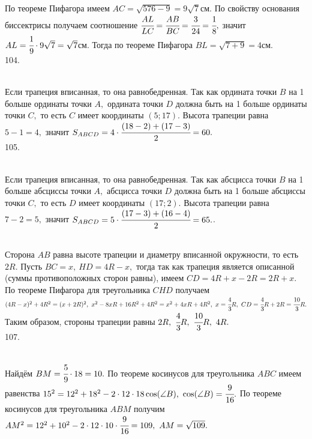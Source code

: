 По теореме Пифагора имеем $AC=\sqrt{576-9}=9\sqrt{7}$см. По свойству основания биссектрисы получаем соотношение $\cfrac{AL}{LC}=\cfrac{AB}{BC}=\cfrac{3}{24}=\cfrac{1}{8},$ значит $AL=\cfrac{1}{9}\cdot9\sqrt{7}=\sqrt{7}$см. Тогда  по теореме Пифагора $BL=\sqrt{7+9}=4$см.\\
104. \begin{figure}[ht!]
\end{figure}\\
Если трапеция вписанная, то она равнобедренная. Так как ордината точки $B$ на 1 больше ординаты точки $A,$ ордината точки $D$ должна быть на 1 больше ординаты точки $C,$ то есть $C$ имеет координаты $(5;17).$ Высота трапеции равна $5-1=4,$ значит $S_{ABCD}=4\cdot\cfrac{(18-2)+(17-3)}{2}=60.$\\
105. \begin{figure}[ht!]
\end{figure}\\
Если трапеция вписанная, то она равнобедренная. Так как абсцисса точки $B$ на 1 больше абсциссы точки $A,$ абсцисса точки $D$ должна быть на 1 больше абсциссы точки $C,$ то есть $D$ имеет координаты $(17;2).$ Высота трапеции равна $7-2=5,$ значит $S_{ABCD}=5\cdot\cfrac{(17-3)+(16-4)}{2}=65.$\newpage{}. \begin{figure}[ht!]
\end{figure}\\
Сторона $AB$ равна высоте трапеции и диаметру вписанной окружности, то есть $2R.$ Пусть $BC=x,\ HD=4R-x,$ тогда так как трапеция является описанной (суммы противоположных сторон равны), имеем $CD=4R+x-2R=2R+x.$ По теореме Пифагора для треугольника $CHD$ получаем $(4R-x)^2+4R^2=(x+2R)^2,\
x^2-8xR+16R^2+4R^2=x^2+4xR+4R^2,\ x=\cfrac{4}{3}R,\ CD=\cfrac{4}{3}R+2R=\cfrac{10}{3}R.$ Таким образом,
стороны трапеции равны $2R,\ \cfrac{4}{3}R,\ \cfrac{10}{3}R,\ 4R.$\\
107. \begin{figure}[ht!]
\end{figure}\\
Найдём $BM=\cfrac{5}{9}\cdot18=10.$ По теореме косинусов для треугольника $ABC$ имеем равенства $15^2=12^2+18^2-2\cdot12\cdot18\cos(\angle B),\ \cos(\angle B)=\cfrac{9}{16}.$ По теореме косинусов для треугольника $ABM$ получим $AM^2=12^2+10^2-2\cdot12\cdot10\cdot\cfrac{9}{16}=109,\ AM=\sqrt{109}.$\\
